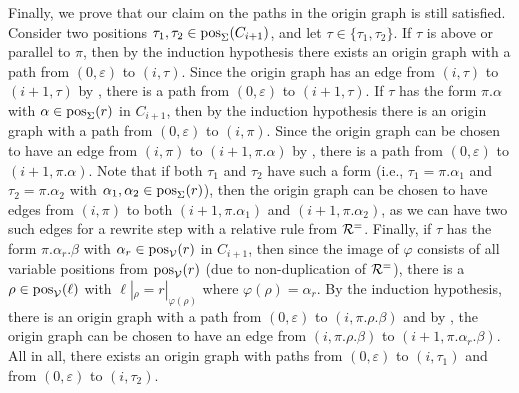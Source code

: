 \begin{myproof}
\begin{itemize}
        Finally, we prove that our claim on the paths in the origin graph is
        still satisfied.
        Consider two positions $\tau_1, \tau_2 \in \mathrm{pos}_\Sigma(C_{i+1})$, and let $\tau \in \{\tau_1, \tau_2\}$.
        If $\tau$ is above or parallel to $\pi$, then by the induction
        hypothesis there exists an origin graph with
        a path from $(0,\varepsilon)$ to $(i, \tau)$. Since the origin graph has an edge from
        $(i, \tau)$ to $(i+1,\tau)$ by , 
        there is a path from $(0,\varepsilon)$ to $(i+1, \tau)$.
        If $\tau$ has the form $\pi.\alpha$ with $\alpha \in \mathrm{pos}_\Sigma(r)$ in $C_{i+1}$,
        then by the induction
        hypothesis there is an origin graph with
        a path from $(0,\varepsilon)$ to $(i, \pi)$. Since the origin graph can be chosen to
        have an edge from
        $(i, \pi)$ to $(i+1,\pi.\alpha)$ by , 
        there is a path from $(0,\varepsilon)$ to $(i+1,\pi.\alpha)$.
        Note that if both $\tau_1$ and $\tau_2$ have such a form (i.e., $\tau_1 =
        \pi.\alpha_1$ and $\tau_2 = \pi.\alpha_2$ with $\alpha_1, \alpha_2 \in
        \mathrm{pos}_\Sigma(r)$),
        then the origin graph can be chosen to have edges from $(i,\pi)$ to both 
        $(i+1,\pi.\alpha_1)$ and $(i+1,\pi.\alpha_2)$, as we can have  two such edges for
        a rewrite step with a relative rule from $\mathcal{R}^=$.
        Finally, if $\tau$ has the form $\pi.\alpha_r.\beta$ with
        $\alpha_r \in \mathrm{pos}_{\mathcal{V}}(r)$ in $C_{i+1}$,
        then since the image of $\varphi$ consists of all variable positions from
         $\mathrm{pos}_{\mathcal{V}}(r)$ (due to non-duplication of $\mathcal{R}^=$),
        there is a $\rho \in \mathrm{pos}_{\mathcal{V}}(\ell)$ with
        $\ell|_{\rho} = r|_{\varphi(\rho)}$ where $\varphi(\rho)
        = \alpha_r$.
        By the induction hypothesis, there is an origin graph with
        a path from $(0,\varepsilon)$ to $(i, \pi.\rho.\beta)$ and by 
        , the origin graph can be chosen to have an edge from
        $(i, \pi.\rho.\beta)$ to $(i+1, \pi.\alpha_r.\beta)$.
        All in all, there exists an origin graph with paths from $(0,\varepsilon)$ to $(i, \tau_1)$
        and from $(0,\varepsilon)$ to $(i, \tau_2)$.
    \end{itemize}



\end{myproof}
